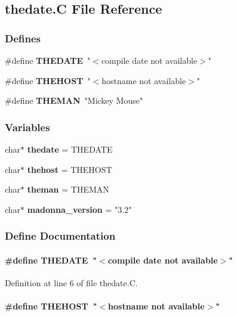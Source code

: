 \subsection{thedate.C File Reference}
\label{thedate.C}
\subsubsection*{Defines}
\begin{CompactItemize}
\item 
\#define {\bf THEDATE}\ "$<$compile date not available$>$"
\item 
\#define {\bf THEHOST}\ "$<$hostname not available$>$"
\item 
\#define {\bf THEMAN}\ "Mickey Mouse"
\end{CompactItemize}
\subsubsection*{Variables}
\begin{CompactItemize}
\item 
char$\ast$ {\bf thedate} = THEDATE
\item 
char$\ast$ {\bf thehost} = THEHOST
\item 
char$\ast$ {\bf theman} = THEMAN
\item 
char$\ast$ {\bf madonna\_\-version} = "3.2"
\end{CompactItemize}


\subsubsection{Define Documentation}
\label{thedate.C_a0}
\paragraph{\setlength{\rightskip}{0pt plus 5cm}\#define THEDATE\ "$<$compile date not available$>$"}\hfill



Definition at line 6 of file thedate.C.\label{thedate.C_a1}
\paragraph{\setlength{\rightskip}{0pt plus 5cm}\#define THEHOST\ "$<$hostname not available$>$"}\hfill



